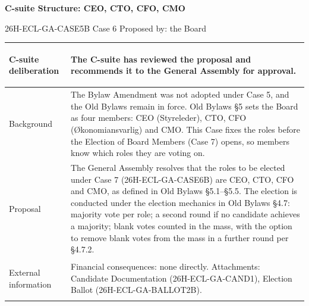 \documentclass{../../../Common/Latex/Templates/rapport}
\begin{document}
\reportmainmatter
\small
\setlength{\parindent}{0pt}
\setlength{\tabcolsep}{6pt}
\renewcommand{\arraystretch}{1.2}

\begin{center}
  {\Large\bfseries C-suite Structure: CEO, CTO, CFO, CMO}\par
  \vspace{0.15cm}
  {\normalsize 26H-ECL-GA-CASE5B \textperiodcentered{} Case 6 \textperiodcentered{} Proposed by: the Board}\par
  \vspace{0.1cm}
  {\small \meetingline}\par
\end{center}

\vspace{0.3cm}
\begin{tabularx}{\textwidth}{|>{\bfseries\raggedright\arraybackslash}p{4.2cm}|X|}
  \hline
  C-suite deliberation & The C-suite has reviewed the proposal and recommends it to the General Assembly for approval.                                                                                                                                                                                                                                                                                                                                              \\
  \hline
  Background           & The Bylaw Amendment was not adopted under Case 5, and the Old Bylaws remain in force. Old Bylaws \S5 sets the Board as four members: CEO (Styreleder), CTO, CFO (Økonomiansvarlig) and CMO. This Case fixes the roles before the Election of Board Members (Case 7) opens, so members know which roles they are voting on.                                                                                                                 \\
  \hline
  Proposal             & The General Assembly resolves that the roles to be elected under Case 7 (26H-ECL-GA-CASE6B) are CEO, CTO, CFO and CMO, as defined in Old Bylaws \S5.1--\S5.5. The election is conducted under the election mechanics in Old Bylaws \S4.7: majority vote per role; a second round if no candidate achieves a majority; blank votes counted in the mass, with the option to remove blank votes from the mass in a further round per \S4.7.2. \\
  \hline
  External information & Financial consequences: none directly. Attachments: Candidate Documentation (26H-ECL-GA-CAND1), Election Ballot (26H-ECL-GA-BALLOT2B).                                                                                                                                                                                                                                                                                                     \\
  \hline
\end{tabularx}
\end{document}
